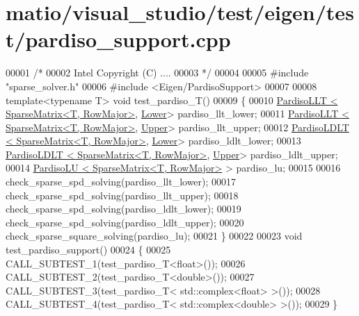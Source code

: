 \hypertarget{matio_2visual__studio_2test_2eigen_2test_2pardiso__support_8cpp_source}{}\section{matio/visual\+\_\+studio/test/eigen/test/pardiso\+\_\+support.cpp}
\label{matio_2visual__studio_2test_2eigen_2test_2pardiso__support_8cpp_source}

\begin{DoxyCode}
00001 \textcolor{comment}{/* }
00002 \textcolor{comment}{   Intel Copyright (C) ....}
00003 \textcolor{comment}{*/}
00004 
00005 \textcolor{preprocessor}{#include "sparse\_solver.h"}
00006 \textcolor{preprocessor}{#include <Eigen/PardisoSupport>}
00007 
00008 \textcolor{keyword}{template}<\textcolor{keyword}{typename} T> \textcolor{keywordtype}{void} test\_pardiso\_T()
00009 \{
00010   \hyperlink{class_eigen_1_1_pardiso_l_l_t}{PardisoLLT < SparseMatrix<T, RowMajor>}, 
      \hyperlink{group__enums_gga39e3366ff5554d731e7dc8bb642f83cda891792b8ed394f7607ab16dd716f60e6}{Lower}> pardiso\_llt\_lower;
00011   \hyperlink{class_eigen_1_1_pardiso_l_l_t}{PardisoLLT < SparseMatrix<T, RowMajor>}, 
      \hyperlink{group__enums_gga39e3366ff5554d731e7dc8bb642f83cda6bcb58be3b8b8ec84859ce0c5ac0aaec}{Upper}> pardiso\_llt\_upper;
00012   \hyperlink{class_eigen_1_1_pardiso_l_d_l_t}{PardisoLDLT < SparseMatrix<T, RowMajor>}, 
      \hyperlink{group__enums_gga39e3366ff5554d731e7dc8bb642f83cda891792b8ed394f7607ab16dd716f60e6}{Lower}> pardiso\_ldlt\_lower;
00013   \hyperlink{class_eigen_1_1_pardiso_l_d_l_t}{PardisoLDLT < SparseMatrix<T, RowMajor>}, 
      \hyperlink{group__enums_gga39e3366ff5554d731e7dc8bb642f83cda6bcb58be3b8b8ec84859ce0c5ac0aaec}{Upper}> pardiso\_ldlt\_upper;
00014   \hyperlink{class_eigen_1_1_pardiso_l_u}{PardisoLU  < SparseMatrix<T, RowMajor>} > pardiso\_lu;
00015 
00016   check\_sparse\_spd\_solving(pardiso\_llt\_lower);
00017   check\_sparse\_spd\_solving(pardiso\_llt\_upper);
00018   check\_sparse\_spd\_solving(pardiso\_ldlt\_lower);
00019   check\_sparse\_spd\_solving(pardiso\_ldlt\_upper);
00020   check\_sparse\_square\_solving(pardiso\_lu);
00021 \}
00022 
00023 \textcolor{keywordtype}{void} test\_pardiso\_support()
00024 \{
00025   CALL\_SUBTEST\_1(test\_pardiso\_T<float>());
00026   CALL\_SUBTEST\_2(test\_pardiso\_T<double>());
00027   CALL\_SUBTEST\_3(test\_pardiso\_T< std::complex<float> >());
00028   CALL\_SUBTEST\_4(test\_pardiso\_T< std::complex<double> >());
00029 \}
\end{DoxyCode}
